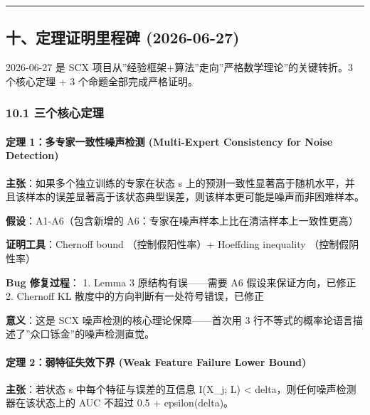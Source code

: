 \documentclass[
  12pt,
]{ctexart}
\begin{document}
\begin{center}\rule{0.5\linewidth}{0.5pt}\end{center}

\subsection{十、定理证明里程碑
(2026-06-27)}\label{ux5341ux5b9aux7406ux8bc1ux660eux91ccux7a0bux7891-2026-06-27}

2026-06-27 是 SCX
项目从''经验框架+算法''走向''严格数学理论''的关键转折。3 个核心定理 + 3
个命题全部完成严格证明。

\subsubsection{10.1
三个核心定理}\label{ux4e09ux4e2aux6838ux5fc3ux5b9aux7406}

\paragraph{定理 1：多专家一致性噪声检测 (Multi-Expert Consistency for
Noise
Detection)}\label{ux5b9aux7406-1ux591aux4e13ux5bb6ux4e00ux81f4ux6027ux566aux58f0ux68c0ux6d4b-multi-expert-consistency-for-noise-detection}

\textbf{主张}：如果多个独立训练的专家在状态 s
上的预测一致性显著高于随机水平，并且该样本的误差显著高于该状态典型误差，则该样本更可能是噪声而非困难样本。

\textbf{假设}：A1-A6（包含新增的
A6：专家在噪声样本上比在清洁样本上一致性更高）

\textbf{证明工具}：Chernoff bound （控制假阳性率）+ Hoeffding inequality
（控制假阴性率）

\textbf{Bug 修复过程}： 1. Lemma 3 原结构有误------需要 A6
假设来保证方向，已修正 2. Chernoff KL
散度中的方向判断有一处符号错误，已修正

\textbf{意义}：这是 SCX 噪声检测的核心理论保障------首次用 3
行不等式的概率论语言描述了''众口铄金''的噪声检测直觉。

\paragraph{定理 2：弱特征失效下界 (Weak Feature Failure Lower
Bound)}\label{ux5b9aux7406-2ux5f31ux7279ux5f81ux5931ux6548ux4e0bux754c-weak-feature-failure-lower-bound}

\textbf{主张}：若状态 s 中每个特征与误差的互信息 I(X\_j; L) \textless{}
delta，则任何噪声检测器在该状态上的 AUC 不超过 0.5 + epsilon(delta)。
\end{document}
